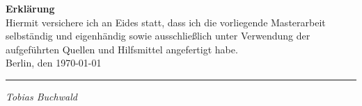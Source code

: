 \textbf{Erkl\"arung}\\

Hiermit versichere ich an Eides statt, dass ich die vorliegende Masterarbeit selbst\"andig und eigenh\"andig sowie
ausschlie\ss lich unter Verwendung der aufgef\"uhrten Quellen und Hilfsmittel angefertigt habe. \\


Berlin, den \today
\newline

\rule[-0.2cm]{10cm}{0.5pt}

\textsl{Tobias Buchwald} 